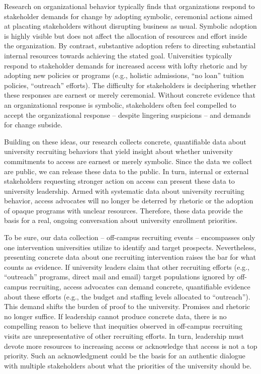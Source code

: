 \documentclass[twoside]{article}
\begin{document}
Research on organizational behavior typically finds that organizations respond to stakeholder demands for change by adopting symbolic, ceremonial actions aimed at placating stakeholders without disrupting business as usual.  Symbolic adoption is highly visible but does not affect the allocation of resources and effort inside the organization. By contrast, substantive adoption refers to directing substantial internal resources towards achieving the stated goal. Universities typically respond to stakeholder demands for increased access with lofty rhetoric and by adopting new policies or programs (e.g., holistic admissions, ``no loan'' tuition policies, ``outreach'' efforts).  The difficulty for stakeholders is deciphering whether these responses are earnest or merely ceremonial. Without concrete evidence that an organizational response is symbolic, stakeholders often feel compelled to accept the organizational response -- despite lingering suspicions -- and demands for change subside.

Building on these ideas, our research collects concrete, quantifiable data about university recruiting behaviors that yield insight about whether university commitments to access are earnest or merely symbolic.  Since the data we collect are public, we can release these data to the public. In turn, internal or external stakeholders requesting stronger action on access can present these data to university leadership.  Armed with systematic data about university recruiting behavior, access advocates will no longer be deterred by rhetoric or the adoption of opaque programs with unclear resources.  Therefore, these data provide the basis for a real, ongoing conversation about university enrollment priorities.  

To be sure, our data collection -- off-campus recruiting events -- encompasses only one intervention universities utilize to identify and target prospects. Nevertheless, presenting concrete data about one recruiting intervention raises the bar for what counts as evidence. If university leaders claim that other recruiting efforts (e.g., ``outreach'' programs, direct mail and email) target populations ignored by off-campus recruiting, access advocates can demand concrete, quantifiable evidence about these efforts (e.g., the budget and staffing levels allocated to ``outreach'').  This demand shifts the burden of proof to the university. Promises and rhetoric no longer suffice. If leadership cannot produce concrete data, there is no compelling reason to believe that inequities observed in off-campus recruiting visits are unrepresentative of other recruiting efforts. In turn, leadership must devote more resources to increasing access or acknowledge that access is not a top priority.  Such an acknowledgment could be the basis for an authentic dialogue with multiple stakeholders about what the priorities of the university should be.
\end{document}
